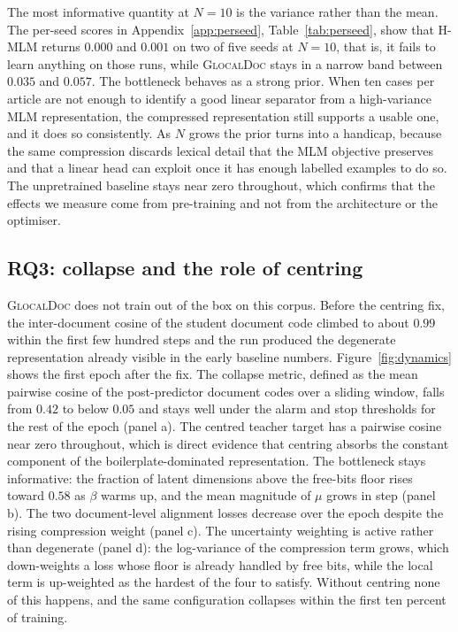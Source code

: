 \documentclass[conference]{IEEEtran}
\newcommand{\glocal}{\textsc{GlocalDoc}}
\newcommand{\hmlm}{\mbox{H-MLM}}
\begin{document}
The most informative quantity at $N=10$ is the variance rather than the mean. The
per-seed scores in Appendix~\ref{app:perseed}, Table~\ref{tab:perseed}, show that
\hmlm{} returns $0.000$ and $0.001$ on two of five seeds at $N=10$, that is, it fails
to learn anything on those runs, while \glocal{} stays in a narrow band between
$0.035$ and $0.057$. The bottleneck behaves as a strong prior. When ten cases per
article are not enough to identify a good linear separator from a high-variance MLM
representation, the compressed representation still supports a usable one, and it
does so consistently. As $N$ grows the prior turns into a handicap, because the same
compression discards lexical detail that the MLM objective preserves and that a
linear head can exploit once it has enough labelled examples to do so. The
unpretrained baseline stays near zero throughout, which confirms that the effects we
measure come from pre-training and not from the architecture or the optimiser.

\subsection{RQ3: collapse and the role of centring}
\glocal{} does not train out of the box on this corpus. Before the centring fix, the
inter-document cosine of the student document code climbed to about $0.99$ within the
first few hundred steps and the run produced the degenerate representation already
visible in the early baseline numbers. Figure~\ref{fig:dynamics} shows the first
epoch after the fix. The collapse metric, defined as the mean pairwise cosine of the
post-predictor document codes over a sliding window, falls from $0.42$ to below
$0.05$ and stays well under the alarm and stop thresholds for the rest of the epoch
(panel a). The centred teacher target has a pairwise cosine near zero throughout,
which is direct evidence that centring absorbs the constant component of the
boilerplate-dominated representation. The bottleneck stays informative: the fraction
of latent dimensions above the free-bits floor rises toward $0.58$ as $\beta$ warms
up, and the mean magnitude of $\mu$ grows in step (panel b). The two document-level
alignment losses decrease over the epoch despite the rising compression weight
(panel c). The uncertainty weighting is active rather than degenerate (panel d): the
log-variance of the compression term grows, which down-weights a loss whose floor is
already handled by free bits, while the local term is up-weighted as the hardest of
the four to satisfy. Without centring none of this happens, and the same
configuration collapses within the first ten percent of training.
\end{document}
